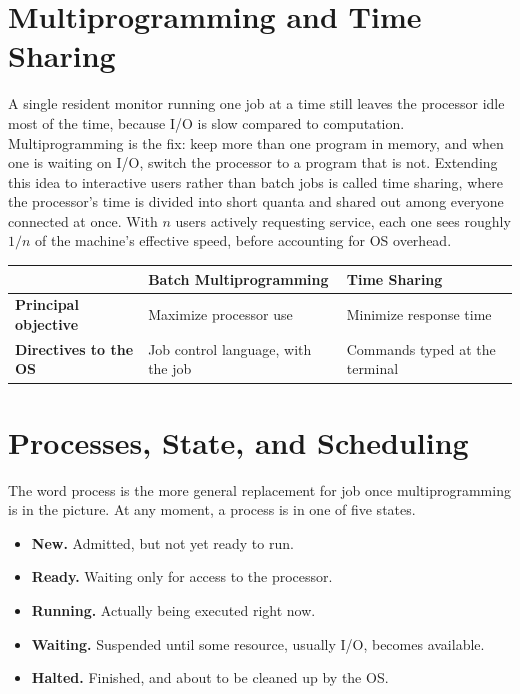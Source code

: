 \documentclass[11pt]{article}
\begin{document}
\section{Multiprogramming and Time Sharing}

A single resident monitor running one job at a time still leaves the processor idle most of the time, because I/O is slow compared to computation. Multiprogramming is the fix: keep more than one program in memory, and when one is waiting on I/O, switch the processor to a program that is not. Extending this idea to interactive users rather than batch jobs is called time sharing, where the processor's time is divided into short quanta and shared out among everyone connected at once. With $n$ users actively requesting service, each one sees roughly $1/n$ of the machine's effective speed, before accounting for OS overhead.

\begin{center}
\renewcommand{\arraystretch}{1.3}
\begin{tabular}{>{\bfseries}l l l}
\toprule
\rowcolor{navy!8}
& Batch Multiprogramming & Time Sharing \\
\midrule
Principal objective & Maximize processor use & Minimize response time \\
Directives to the OS & Job control language, with the job & Commands typed at the terminal \\
\bottomrule
\end{tabular}
\end{center}

\section{Processes, State, and Scheduling}

The word process is the more general replacement for job once multiprogramming is in the picture. At any moment, a process is in one of five states.

\begin{itemize}[leftmargin=1.4em]
  \item \textbf{New.} Admitted, but not yet ready to run.
  \item \textbf{Ready.} Waiting only for access to the processor.
  \item \textbf{Running.} Actually being executed right now.
  \item \textbf{Waiting.} Suspended until some resource, usually I/O, becomes available.
  \item \textbf{Halted.} Finished, and about to be cleaned up by the OS.
\end{itemize}
\end{document}

